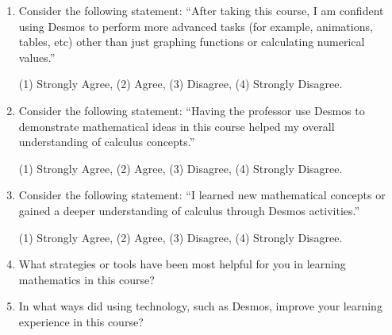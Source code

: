 \documentclass[11pt]{article}
\begin{document}
\begin{enumerate}[{$\qquad 1.]
\item Consider the following statement: ``After taking this course, I am confident using Desmos to perform more advanced tasks (for example, animations, tables, etc) other than just graphing functions or calculating numerical values.''
\begin{center} 
(1) Strongly Agree, \qquad (2) Agree, \qquad (3) Disagree, \qquad (4) Strongly Disagree. \end{center}

\item Consider the following statement: ``Having the professor use Desmos to demonstrate mathematical ideas in this course helped my overall understanding of calculus concepts.''
\begin{center} 
(1) Strongly Agree, \qquad (2) Agree, \qquad (3) Disagree, \qquad (4) Strongly Disagree. \end{center}

\item Consider the following statement: ``I learned new mathematical concepts or gained a deeper understanding of calculus through Desmos activities.''
\begin{center} 
(1) Strongly Agree, \qquad (2) Agree, \qquad (3) Disagree, \qquad (4) Strongly Disagree. \end{center}


\item What strategies or tools have been most helpful for you in learning mathematics in this course? \vfill

\item In what ways did using technology, such as Desmos, improve your learning experience in this course? \vfill


\end{enumerate}
\end{document}

